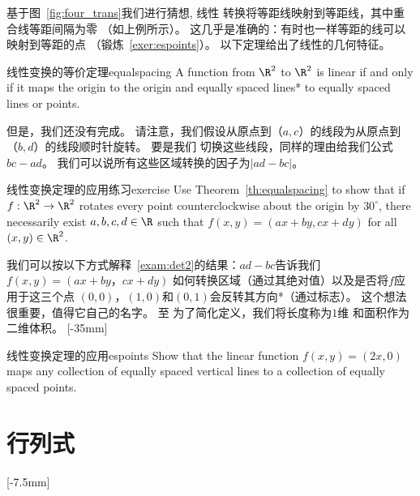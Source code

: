 \documentclass[indent]{watsonbook}
\begin{document}
{基于图~\ref{fig:four_trans}我们进行猜想, 线性
转换将等距线映射到等距线，其中重合线等距间隔为零
（如上例所示）。 这几乎是准确的：有时也一样等距的线可以映射到等距的点
（锻炼~\ref{exer:espoints}）。 以下定理给出了线性的几何特征。

\begin{theo}{线性变换的等价定理}{equalspacing}
  A function from $\R^2$ to $\R^2$ is linear if and only if it maps
  the origin to the origin and equally spaced lines* to equally spaced
  lines or points. 
\end{theo}

但是，我们还没有完成。 请注意，我们假设从原点到$（a,c）$的线段为从原点到$（b,d）$的线段顺时针旋转。 要是我们
切换这些线段，同样的理由给我们公式$ bc-ad $。 我们可以说所有这些区域转换的因子为$\boxed{|ad-bc|}$。

\begin{exercise}{线性变换定理的应用练习}{exercise}
  Use Theorem~\ref{th:equalspacing} to show that if
  $f : \R^2 \to \R^2$ rotates every point counterclockwise about the
  origin by $30^\circ$, there necessarily exist $a,b,c,d\in\R$ such
  that $f(x,y) = (ax+ by, cx+ dy)$ for all $(x,y) \in\R^2$.
\end{exercise}

我们可以按以下方式解释~\ref{exam:det2}的结果：$ ad-bc $告诉我们$ f(x,y)=(ax + by，cx + dy)$
如何转换区域（通过其绝对值）以及是否将$f$应用于这三个点
$(0,0)$，$(1,0)$和$(0,1)$会反转其方向*（通过标志）。 这个想法很重要，值得它自己的名字。 至
为了简化定义，我们将长度称为$ 1 $维
和面积作为二维体积。  [-35mm]

\begin{exercise}{线性变换定理的应用}{espoints}
  Show that the linear function $f(x,y)=(2x,0)$ maps any collection of
  equally spaced vertical lines to a collection of equally spaced points.
\end{exercise}

\section{行列式} \label{sec:det}

[-7.5mm]

}
\end{document}

